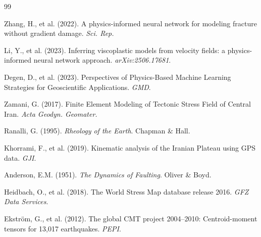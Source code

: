\documentclass[11pt, a4paper]{article}
\begin{document}
\begin{thebibliography}{99}

Zhang, H., et al. (2022). A physics-informed neural network for modeling fracture without gradient damage. \textit{Sci. Rep.}

Li, Y., et al. (2023). Inferring viscoplastic models from velocity fields: a physics-informed neural network approach. \textit{arXiv:2506.17681}.

Degen, D., et al. (2023). Perspectives of Physics-Based Machine Learning Strategies for Geoscientific Applications. \textit{GMD}.

Zamani, G. (2017). Finite Element Modeling of Tectonic Stress Field of Central Iran. \textit{Acta Geodyn. Geomater.}

Ranalli, G. (1995). \textit{Rheology of the Earth}. Chapman \& Hall.

Khorrami, F., et al. (2019). Kinematic analysis of the Iranian Plateau using GPS data. \textit{GJI}.

Anderson, E.M. (1951). \textit{The Dynamics of Faulting}. Oliver \& Boyd.

Heidbach, O., et al. (2018). The World Stress Map database release 2016. \textit{GFZ Data Services}.

Ekström, G., et al. (2012). The global CMT project 2004–2010: Centroid-moment tensors for 13,017 earthquakes. \textit{PEPI}.

\end{thebibliography}
\end{document}
